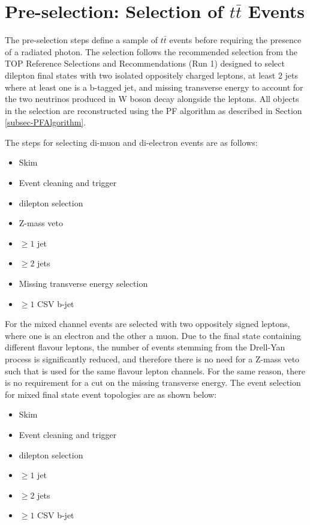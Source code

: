 \section{Pre-selection: Selection of $t\bar{t}$ Events} \label{sec-preselection}

The pre-selection steps define a sample of $t\bar{t}$ events before requiring the presence of a radiated photon. The selection follows the recommended selection from the TOP Reference Selections and Recommendations (Run 1) \cite{TopEventSelection} designed to select dilepton final states with two isolated oppositely charged leptons, at least 2 jets where at least one is a b-tagged jet, and missing transverse energy to account for the two neutrinos produced in W boson decay alongside the leptons. All objects in the selection are reconstructed using the PF algorithm as described in Section \ref{subsec-PFAlgorithm}.  

The steps for selecting di-muon and di-electron events are as follows:  

\begin{itemize}
	\item Skim
	\item Event cleaning and trigger
	\item dilepton selection
	\item Z-mass veto
	\item $\geq 1$ jet
	\item $\geq 2$ jets
	\item Missing transverse energy selection
	\item $\geq 1$ CSV b-jet 
\end{itemize}

For the mixed channel events are selected with two oppositely signed leptons, where one is an electron and the other a muon. Due to the final state containing different flavour leptons, the number of events stemming from the Drell-Yan process is significantly reduced, and therefore there is no need for a Z-mass veto such that is used for the same flavour lepton channels. For the same reason, there is no requirement for a cut on the missing transverse energy. The event selection for mixed final state event topologies are as shown below:

\begin{itemize}
	\item Skim
	\item Event cleaning and trigger
	\item dilepton selection
	\item $\geq 1$ jet
	\item $\geq 2$ jets
	\item $\geq 1$ CSV b-jet 
\end{itemize}  

